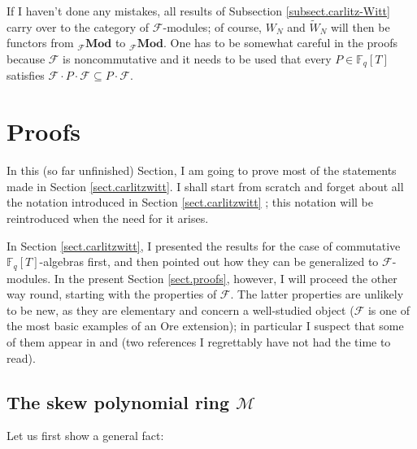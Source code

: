 \documentclass[numbers=enddot,12pt,final,onecolumn,notitlepage]{scrartcl}%
\theoremstyle{definition}
\begin{document}
If I haven't done any mistakes, all results of Subsection
\ref{subsect.carlitz-Witt} carry over to the category of $\mathcal{F}%
$-modules; of course, $W_{N}$ and $\widetilde{W}_{N}$ will then be functors
from $_{\mathcal{F}}\mathbf{Mod}$ to $_{\mathcal{F}}\mathbf{Mod}$. One has to
be somewhat careful in the proofs because $\mathcal{F}$ is noncommutative and
it needs to be used that every $P\in\mathbb{F}_{q}\left[  T\right]  $
satisfies $\mathcal{F}\cdot P\cdot\mathcal{F}\subseteq P\cdot\mathcal{F}$.

\section{\label{sect.proofs}Proofs}

In this (so far unfinished) Section, I am going to prove most of the
statements made in Section \ref{sect.carlitzwitt}. I shall start from scratch
and forget about all the notation introduced in Section \ref{sect.carlitzwitt}%
; this notation will be reintroduced when the need for it arises.

In Section \ref{sect.carlitzwitt}, I presented the results for the case of
commutative $\mathbb{F}_{q}\left[  T\right]  $-algebras first, and then
pointed out how they can be generalized to $\mathcal{F}$-modules. In the
present Section \ref{sect.proofs}, however, I will proceed the other way
round, starting with the properties of $\mathcal{F}$. The latter properties
are unlikely to be new, as they are elementary and concern a well-studied
object ($\mathcal{F}$ is one of the most basic examples of an Ore extension);
in particular I suspect that some of them appear in \cite{ore-pp1} and
\cite{ore-pp2} (two references I regrettably have not had the time to read).

\subsection{The skew polynomial ring $\mathcal{M}$}

Let us first show a general fact:
\end{document}
